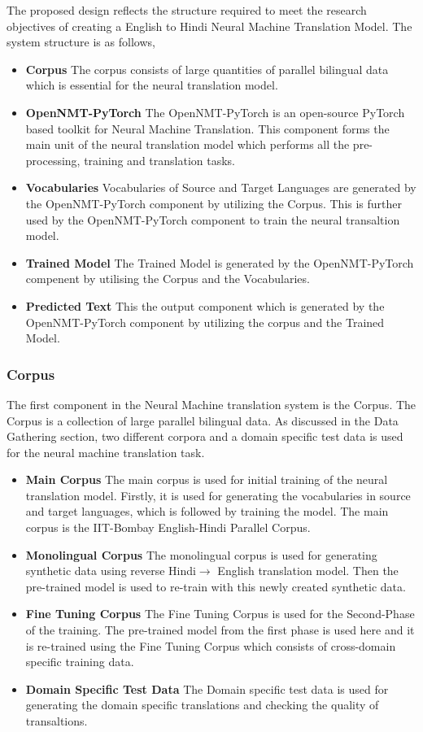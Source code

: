 The proposed design reflects the structure required to meet the research objectives of creating a English to Hindi Neural Machine Translation Model. The system structure is as follows,

\begin{itemize}
    \item \textbf{Corpus} The corpus consists of large quantities of parallel bilingual data which is essential for the neural translation model.
    \item \textbf{OpenNMT-PyTorch} The OpenNMT-PyTorch is an open-source PyTorch based toolkit for Neural Machine Translation. This component forms the main unit of the neural translation model which performs all the pre-processing, training and translation tasks.
    \item \textbf{Vocabularies} Vocabularies of Source and Target Languages are generated by the OpenNMT-PyTorch component by utilizing the Corpus. This is further used by the OpenNMT-PyTorch component to train the neural transaltion model.
    \item \textbf{Trained Model} The Trained Model is generated by the OpenNMT-PyTorch compenent by utilising the Corpus and the Vocabularies.
    \item \textbf{Predicted Text} This the output component which is generated by the OpenNMT-PyTorch component by utilizing the corpus and the Trained Model.
\end{itemize}

\subsubsection{Corpus } The first component in the Neural Machine translation system is the Corpus. The Corpus is a  collection of large parallel bilingual data. As discussed in the Data Gathering section, two different corpora and a domain specific test data is used for the neural machine translation task. 
\begin{itemize}
    \item \textbf{Main Corpus} The main corpus is used for initial training of the neural translation model. Firstly, it is used for generating the vocabularies in source and target languages, which is followed by training the model. The main corpus is the IIT-Bombay English-Hindi Parallel Corpus. 
    \item \textbf{Monolingual Corpus} The monolingual corpus is used for generating synthetic data using reverse Hindi$\rightarrow$ English translation model. Then the pre-trained model is used to re-train with this newly created synthetic data.  
    \item \textbf{Fine Tuning Corpus} The Fine Tuning Corpus is used for the Second-Phase of the training. The pre-trained model from the first phase is used here and it is re-trained using the Fine Tuning Corpus which consists of cross-domain specific training data.
    \item \textbf{Domain Specific Test Data} The Domain specific test data is used for generating the domain specific translations and checking the quality of transaltions.
\end{itemize}

